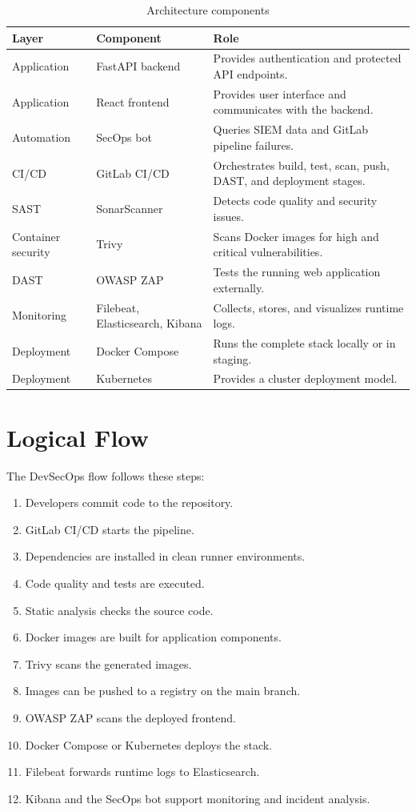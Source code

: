 \documentclass[12pt,a4paper]{report}
\begin{document}
\begin{table}[H]
\centering
\caption{Architecture components}
\begin{tabular}{p{3.2cm}p{4cm}p{7cm}}
\toprule
\textbf{Layer} & \textbf{Component} & \textbf{Role} \\
\midrule
Application & FastAPI backend & Provides authentication and protected API endpoints. \\
Application & React frontend & Provides user interface and communicates with the backend. \\
Automation & SecOps bot & Queries SIEM data and GitLab pipeline failures. \\
CI/CD & GitLab CI/CD & Orchestrates build, test, scan, push, DAST, and deployment stages. \\
SAST & SonarScanner & Detects code quality and security issues. \\
Container security & Trivy & Scans Docker images for high and critical vulnerabilities. \\
DAST & OWASP ZAP & Tests the running web application externally. \\
Monitoring & Filebeat, Elasticsearch, Kibana & Collects, stores, and visualizes runtime logs. \\
Deployment & Docker Compose & Runs the complete stack locally or in staging. \\
Deployment & Kubernetes & Provides a cluster deployment model. \\
\bottomrule
\end{tabular}
\end{table}

\section{Logical Flow}

The DevSecOps flow follows these steps:

\begin{enumerate}[leftmargin=*]
    \item Developers commit code to the repository.
    \item GitLab CI/CD starts the pipeline.
    \item Dependencies are installed in clean runner environments.
    \item Code quality and tests are executed.
    \item Static analysis checks the source code.
    \item Docker images are built for application components.
    \item Trivy scans the generated images.
    \item Images can be pushed to a registry on the main branch.
    \item OWASP ZAP scans the deployed frontend.
    \item Docker Compose or Kubernetes deploys the stack.
    \item Filebeat forwards runtime logs to Elasticsearch.
    \item Kibana and the SecOps bot support monitoring and incident analysis.
\end{enumerate}
\end{document}
